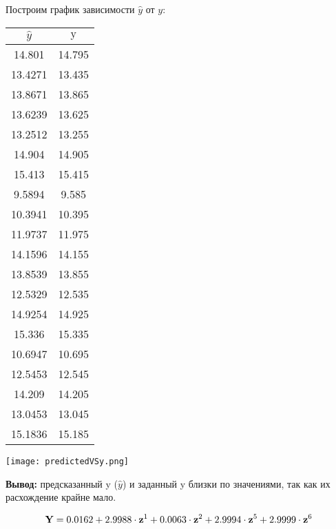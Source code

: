 Построим график зависимости $\hat{y}$ от $y$:

\renewcommand{\arraystretch}{0.65}
\begin{center}
    \begin{tabular}{ | c | c | } 
    \hline
    \textrm{$\hat{y}$} & $\textrm{y}$ \\
    \hline
    14.801 & 14.795 \\
    \hline
   13.4271 & 13.435 \\
    \hline
   13.8671 & 13.865 \\
    \hline
   13.6239 & 13.625 \\
    \hline
   13.2512 & 13.255 \\
    \hline
   14.904 & 14.905 \\
    \hline
   15.413 & 15.415 \\
    \hline
   9.5894 & 9.585 \\
    \hline
   10.3941 & 10.395 \\
    \hline
   11.9737 & 11.975 \\
    \hline
   14.1596 & 14.155 \\
    \hline
   13.8539 & 13.855 \\
    \hline
   12.5329 & 12.535 \\
    \hline
   14.9254 & 14.925 \\
    \hline
   15.336 & 15.335 \\
    \hline
   10.6947 & 10.695 \\
    \hline
   12.5453 & 12.545 \\
    \hline
   14.209 & 14.205 \\
    \hline
   13.0453 & 13.045 \\
    \hline
   15.1836 & 15.185 \\
    \hline 
    \end{tabular}
\end{center}

\begin{center}
    \texttt{[image: predictedVSy.png]}
\end{center}

\textbf{Вывод:} предсказанный y ($\hat{y}$) и заданный y близки по значениями, так как их расхождение крайне мало.

\begin{equation*}
    \textrm{\textbf{Y}} = 0.0162 + 2.9988 \cdot \textrm{\textbf{z}}^1 + 0.0063 \cdot \textrm{\textbf{z}}^2 + 2.9994 \cdot \textrm{\textbf{z}}^5 + 2.9999 \cdot \textrm{\textbf{z}}^6
\end{equation*}

